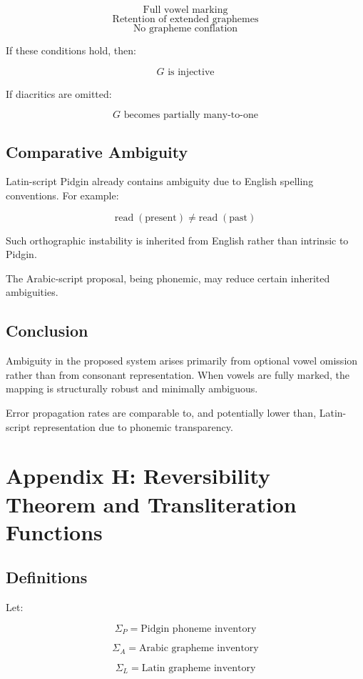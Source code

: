 \documentclass[12pt]{article}
\begin{document}
\[
\text{Full vowel marking}
\]
\[
\text{Retention of extended graphemes}
\]
\[
\text{No grapheme conflation}
\]

If these conditions hold, then:

\[
G \text{ is injective}
\]

If diacritics are omitted:

\[
G \text{ becomes partially many-to-one}
\]

\subsection{Comparative Ambiguity}

Latin-script Pidgin already contains ambiguity due to English spelling conventions. For example:

\[
\text{read} \; (\text{present}) \neq \text{read} \; (\text{past})
\]

Such orthographic instability is inherited from English rather than intrinsic to Pidgin.

The Arabic-script proposal, being phonemic, may reduce certain inherited ambiguities.

\subsection{Conclusion}

Ambiguity in the proposed system arises primarily from optional vowel omission rather than from consonant representation. When vowels are fully marked, the mapping is structurally robust and minimally ambiguous.

Error propagation rates are comparable to, and potentially lower than, Latin-script representation due to phonemic transparency.

\section{Appendix H: Reversibility Theorem and Transliteration Functions}

\subsection{Definitions}

Let:

\[
\Sigma_P = \text{Pidgin phoneme inventory}
\]

\[
\Sigma_A = \text{Arabic grapheme inventory}
\]

\[
\Sigma_L = \text{Latin grapheme inventory}
\]
\end{document}
